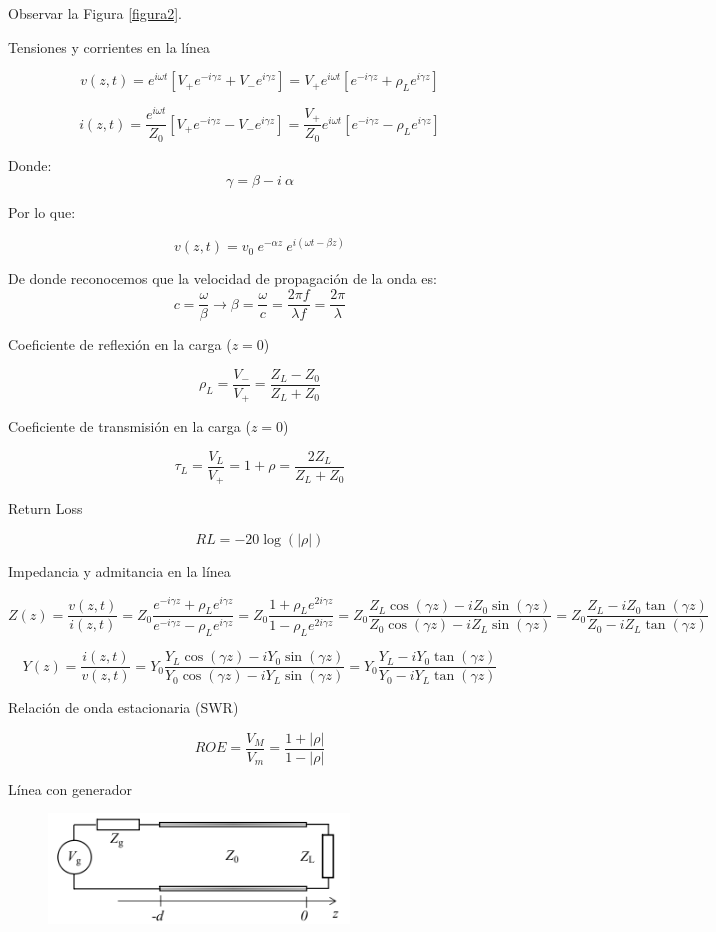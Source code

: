 \documentclass{article}
\begin{document}
Observar la Figura \ref{figura2}. %

Tensiones y corrientes en la línea

\[
 v(z,t) = e^{i \omega t} [V_+ e^{-i \gamma z} + V_- e^{i \gamma z}] =
 V_+ e^{i \omega t}[ e^{-i \gamma z} + \rho_L e^{i \gamma z}]
\]

\[
 i(z,t) = \frac{e^{i \omega t}}{Z_0} [V_+ e^{-i \gamma z} - V_- e^{i \gamma z}] =
 \frac{V_+}{Z_0} e^{i \omega t}[ e^{-i \gamma z} - \rho_L e^{i \gamma z}]
\]

Donde:
\[
 \gamma = \beta - i \ \alpha
\]

Por lo que:

\[
 v(z,t) = v_0 \ e^{-\alpha z} \  e^{i (\omega t - \beta z)} 
\]

De donde reconocemos que la velocidad de propagación de la onda es:
\[
 c = \frac{\omega}{\beta} \longrightarrow \beta = \frac{\omega}{c} = \frac{2 \pi f}{\lambda f} = \frac{2 \pi}{\lambda}
\]


Coeficiente de reflexión en la carga ($z=0$)

\[
 \rho_L = \frac{V_-}{V_+}= \frac{Z_L - Z_0}{Z_L+Z_0}
\]

Coeficiente de transmisión en la carga ($z=0$)

\[
 \tau_L=\frac{V_L}{V_+}= 1+\rho = \frac{2 Z_L}{Z_L+Z_0}
\]


Return Loss

\[
 RL = -20 \log(|\rho|)
\]

Impedancia y admitancia en la línea

\[
 Z(z) = \frac{v(z,t)}{i(z,t)} =
 Z_0 \frac{ e^{-i \gamma z} + \rho_L e^{i \gamma z} }{ e^{-i \gamma z} - \rho_L e^{i \gamma z} }=
 Z_0 \frac{ 1 + \rho_L e^{2 i \gamma z} }{ 1 - \rho_L e^{2 i \gamma z} }=
 Z_0 \frac{Z_L \cos(\gamma z) - i Z_0 \sin(\gamma z)}{Z_0 \cos(\gamma z) - i Z_L \sin(\gamma z)} =
 Z_0 \frac{Z_L  - i Z_0 \tan(\gamma z)}{Z_0 - i Z_L \tan(\gamma z)}
\]

\[
 Y(z) = \frac{i(z,t)}{v(z,t)} =
 Y_0 \frac{Y_L \cos(\gamma z) - i Y_0 \sin(\gamma z)}{Y_0 \cos(\gamma z) - i Y_L \sin(\gamma z)} =
 Y_0 \frac{Y_L - i Y_0 \tan(\gamma z)}{Y_0 - i Y_L \tan(\gamma z)}
\]

Relación de onda estacionaria (SWR)

\[
 ROE = \frac{V_M}{V_m} = \frac{1+|\rho|}{1-|\rho|}
\]

Línea con generador

\begin{figure}[H]
 \centering
 \includegraphics[width = 8cm]{linea_generador_y_carga} %
\end{figure}
\end{document}
